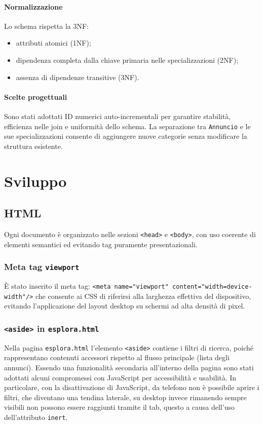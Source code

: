 \documentclass[a4paper,12pt]{article}
\begin{document}
\paragraph{Normalizzazione}
Lo schema rispetta la 3NF:
\begin{itemize}
    \item attributi atomici (1NF);
    \item dipendenza completa dalla chiave primaria nelle specializzazioni (2NF);
    \item assenza di dipendenze transitive (3NF).
\end{itemize}

\paragraph{Scelte progettuali}
Sono stati adottati ID numerici auto-incrementali per garantire stabilità, efficienza nelle join 
e uniformità dello schema.  
La separazione tra \texttt{Annuncio} e le sue specializzazioni consente di aggiungere nuove categorie 
senza modificare la struttura esistente.

\section{Sviluppo}
\subsection{HTML}

Ogni documento è organizzato nelle sezioni \texttt{<head>} e \texttt{<body>}, con uso coerente di elementi semantici ed evitando tag puramente presentazionali.

\subsubsection{Meta tag \texttt{viewport}}
È stato inserito il meta tag:
\texttt{<meta name="viewport" content="width=device-width"/>}
che consente ai CSS di riferirsi alla larghezza effettiva del dispositivo, evitando l’applicazione del layout desktop su schermi ad alta densità di pixel.

\subsubsection{\texttt{<aside>} in \texttt{esplora.html}}
Nella pagina \texttt{esplora.html} l’elemento \texttt{<aside>} contiene i filtri di ricerca, poiché rappresentano contenuti accessori rispetto al flusso principale (lista degli annunci). 
Essendo una funzionalità secondaria all'interno della pagina sono stati adottati alcuni compromessi con JavaScript per accessibilità e usabilità.
In particolare, con la disattivazione di JavaScript, da telefono non è possibile aprire i filtri, che diventano una tendina laterale, su desktop invece rimanendo sempre
visibili non possono essere raggiunti tramite il tab, questo a causa dell'uso dell'attributo \texttt{inert}.
\end{document}
